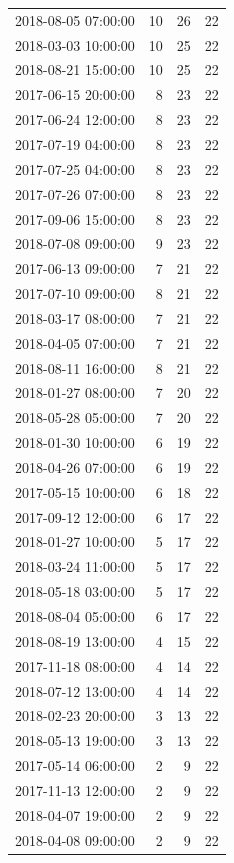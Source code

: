 \begin{tabular}{lrrr}
2018-08-05 07:00:00 & 10 & 26 & 22 \\
2018-03-03 10:00:00 & 10 & 25 & 22 \\
2018-08-21 15:00:00 & 10 & 25 & 22 \\
2017-06-15 20:00:00 & 8 & 23 & 22 \\
2017-06-24 12:00:00 & 8 & 23 & 22 \\
2017-07-19 04:00:00 & 8 & 23 & 22 \\
2017-07-25 04:00:00 & 8 & 23 & 22 \\
2017-07-26 07:00:00 & 8 & 23 & 22 \\
2017-09-06 15:00:00 & 8 & 23 & 22 \\
2018-07-08 09:00:00 & 9 & 23 & 22 \\
2017-06-13 09:00:00 & 7 & 21 & 22 \\
2017-07-10 09:00:00 & 8 & 21 & 22 \\
2018-03-17 08:00:00 & 7 & 21 & 22 \\
2018-04-05 07:00:00 & 7 & 21 & 22 \\
2018-08-11 16:00:00 & 8 & 21 & 22 \\
2018-01-27 08:00:00 & 7 & 20 & 22 \\
2018-05-28 05:00:00 & 7 & 20 & 22 \\
2018-01-30 10:00:00 & 6 & 19 & 22 \\
2018-04-26 07:00:00 & 6 & 19 & 22 \\
2017-05-15 10:00:00 & 6 & 18 & 22 \\
2017-09-12 12:00:00 & 6 & 17 & 22 \\
2018-01-27 10:00:00 & 5 & 17 & 22 \\
2018-03-24 11:00:00 & 5 & 17 & 22 \\
2018-05-18 03:00:00 & 5 & 17 & 22 \\
2018-08-04 05:00:00 & 6 & 17 & 22 \\
2018-08-19 13:00:00 & 4 & 15 & 22 \\
2017-11-18 08:00:00 & 4 & 14 & 22 \\
2018-07-12 13:00:00 & 4 & 14 & 22 \\
2018-02-23 20:00:00 & 3 & 13 & 22 \\
2018-05-13 19:00:00 & 3 & 13 & 22 \\
2017-05-14 06:00:00 & 2 & 9 & 22 \\
2017-11-13 12:00:00 & 2 & 9 & 22 \\
2018-04-07 19:00:00 & 2 & 9 & 22 \\
2018-04-08 09:00:00 & 2 & 9 & 22 \\

\end{tabular}
